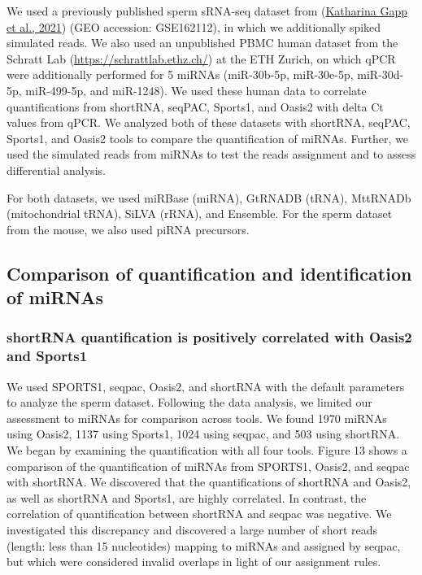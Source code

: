 \documentclass[12pt,twoside]{reedthesis}
\begin{document}
We used a previously published sperm sRNA-seq dataset from (\protect\hyperlink{ref-gapp2021}{Katharina Gapp et al., 2021})
(GEO accession: GSE162112), in which we additionally spiked simulated
reads. We also used an unpublished PBMC human dataset from the Schratt
Lab (\url{https://schrattlab.ethz.ch/}) at the ETH Zurich, on which qPCR
were additionally performed for 5 miRNAs (miR-30b-5p, miR-30e-5p,
miR-30d-5p, miR-499-5p, and miR-1248). We used these human data to
correlate quantifications from shortRNA, seqPAC, Sports1, and Oasis2
with delta Ct values from qPCR. We analyzed both of these datasets with
shortRNA, seqPAC, Sports1, and Oasis2 tools to compare the
quantification of miRNAs. Further, we used the simulated reads from
miRNAs to test the reads assignment and to assess differential analysis.

For both datasets, we used miRBase (miRNA), GtRNADB (tRNA), MttRNADb
(mitochondrial tRNA), SiLVA (rRNA), and Ensemble. For the sperm dataset
from the mouse, we also used piRNA precursors.

\hypertarget{comparison-of-quantification-and-identification-of-mirnas}{%
\subsection{Comparison of quantification and identification of miRNAs}\label{comparison-of-quantification-and-identification-of-mirnas}}

\hypertarget{shortrna-quantification-is-positively-correlated-with-oasis2-and-sports1}{%
\subsubsection{shortRNA quantification is positively correlated with Oasis2 and Sports1}\label{shortrna-quantification-is-positively-correlated-with-oasis2-and-sports1}}

We used SPORTS1, seqpac, Oasis2, and shortRNA with the default
parameters to analyze the sperm dataset. Following the data analysis, we
limited our assessment to miRNAs for comparison across tools. We found
1970 miRNAs using Oasis2, 1137 using Sports1, 1024 using seqpac, and 503
using shortRNA. We began by examining the quantification with all four
tools. Figure 13 shows a comparison of the quantification of miRNAs from
SPORTS1, Oasis2, and seqpac with shortRNA. We discovered that the
quantifications of shortRNA and Oasis2, as well as shortRNA and Sports1,
are highly correlated. In contrast, the correlation of quantification
between shortRNA and seqpac was negative. We investigated this
discrepancy and discovered a large number of short reads (length: less
than 15 nucleotides) mapping to miRNAs and assigned by seqpac, but which
were considered invalid overlaps in light of our assignment rules.
\end{document}
